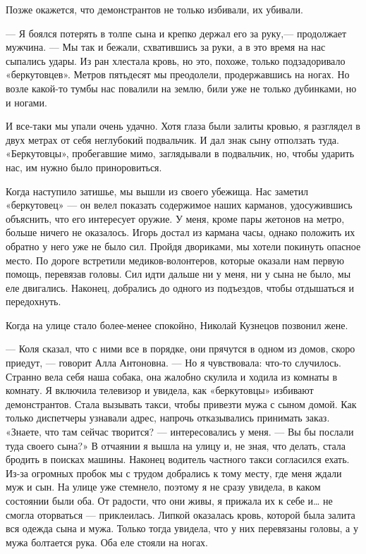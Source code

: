 Позже окажется, что демонстрантов не только избивали, их убивали.

— Я боялся потерять в толпе сына и крепко держал его за руку,— продолжает
мужчина. — Мы так и бежали, схватившись за руки, а в это время на нас сыпались
удары. Из ран хлестала кровь, но это, похоже, только подзадоривало
«беркутовцев». Метров пятьдесят мы преодолели, продержавшись на ногах. Но возле
какой-то тумбы нас повалили на землю, били уже не только дубинками, но и
ногами.

И все-таки мы упали очень удачно. Хотя глаза были залиты кровью, я разглядел в
двух метрах от себя неглубокий подвальчик. И дал знак сыну отползать туда.
«Беркутовцы», пробегавшие мимо, заглядывали в подвальчик, но, чтобы ударить
нас, им нужно было приноровиться.

\zzrule

\begin{multicols}{2}
\end{multicols}

\zzrule

Когда наступило затишье, мы вышли из своего убежища. Нас заметил «беркутовец» —
он велел показать содержимое наших карманов, удосужившись объяснить, что его
интересует оружие. У меня, кроме пары жетонов на метро, больше ничего не
оказалось. Игорь достал из кармана часы, однако положить их обратно у него уже
не было сил. Пройдя двориками, мы хотели покинуть опасное место. По дороге
встретили медиков-волонтеров, которые оказали нам первую помощь, перевязав
головы. Сил идти дальше ни у меня, ни у сына не было, мы еле двигались.
Наконец, добрались до одного из подъездов, чтобы отдышаться и передохнуть.

Когда на улице стало более-менее спокойно, Николай Кузнецов позвонил жене.

— Коля сказал, что с ними все в порядке, они прячутся в одном из домов, скоро
приедут, — говорит Алла Антоновна. — Но я чувствовала: что-то случилось.
Странно вела себя наша собака, она жалобно скулила и ходила из комнаты в
комнату. Я включила телевизор и увидела, как «беркутовцы» избивают
демонстрантов. Стала вызывать такси, чтобы привезти мужа с сыном домой. Как
только диспетчеры узнавали адрес, напрочь отказывались принимать заказ.
«Знаете, что там сейчас творится? — интересовались у меня. — Вы бы послали туда
своего сына?» В отчаянии я вышла на улицу и, не зная, что делать, стала бродить
в поисках машины. Наконец водитель частного такси согласился ехать. Из-за
огромных пробок мы с трудом добрались к тому месту, где меня ждали муж и сын.
На улице уже стемнело, поэтому я не сразу увидела, в каком состоянии были оба.
От радости, что они живы, я прижала их к себе и… не смогла оторваться —
приклеилась. Липкой оказалась кровь, которой была залита вся одежда сына и
мужа. Только тогда увидела, что у них перевязаны головы, а у мужа болтается
рука. Оба еле стояли на ногах.

